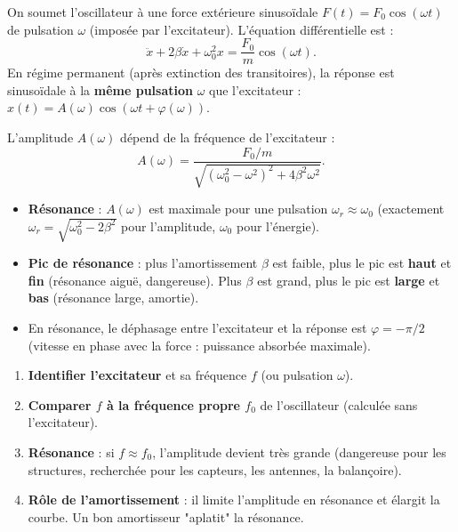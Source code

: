 \documentclass[11pt]{article}
\begin{document}
\begin{definition}
On soumet l'oscillateur à une force extérieure sinusoïdale $F(t) = F_0\cos(\omega t)$ de pulsation $\omega$ (imposée par l'excitateur). L'équation différentielle est :
\[ \ddot{x} + 2\beta\dot{x} + \omega_0^2 x = \frac{F_0}{m}\cos(\omega t). \]
En régime permanent (après extinction des transitoires), la réponse est sinusoïdale à la \textbf{même pulsation} $\omega$ que l'excitateur : $x(t) = A(\omega)\cos(\omega t + \varphi(\omega))$.
\end{definition}

\begin{propriete}
L'amplitude $A(\omega)$ dépend de la fréquence de l'excitateur :
\[ A(\omega) = \frac{F_0/m}{\sqrt{(\omega_0^2-\omega^2)^2 + 4\beta^2\omega^2}}. \]
\begin{itemize}
\item \textbf{Résonance} : $A(\omega)$ est maximale pour une pulsation $\omega_r \approx \omega_0$ (exactement $\omega_r = \sqrt{\omega_0^2 - 2\beta^2}$ pour l'amplitude, $\omega_0$ pour l'énergie).
\item \textbf{Pic de résonance} : plus l'amortissement $\beta$ est faible, plus le pic est \textbf{haut} et \textbf{fin} (résonance aiguë, dangereuse). Plus $\beta$ est grand, plus le pic est \textbf{large} et \textbf{bas} (résonance large, amortie).
\item En résonance, le déphasage entre l'excitateur et la réponse est $\varphi = -\pi/2$ (vitesse en phase avec la force : puissance absorbée maximale).
\end{itemize}
\end{propriete}

\begin{methode}
\begin{enumerate}
\item \textbf{Identifier l'excitateur} et sa fréquence $f$ (ou pulsation $\omega$).
\item \textbf{Comparer $f$ à la fréquence propre $f_0$} de l'oscillateur (calculée sans l'excitateur).
\item \textbf{Résonance} : si $f \approx f_0$, l'amplitude devient très grande (dangereuse pour les structures, recherchée pour les capteurs, les antennes, la balançoire).
\item \textbf{Rôle de l'amortissement} : il limite l'amplitude en résonance et élargit la courbe. Un bon amortisseur "aplatit" la résonance.
\end{enumerate}
\end{methode}
\end{document}
